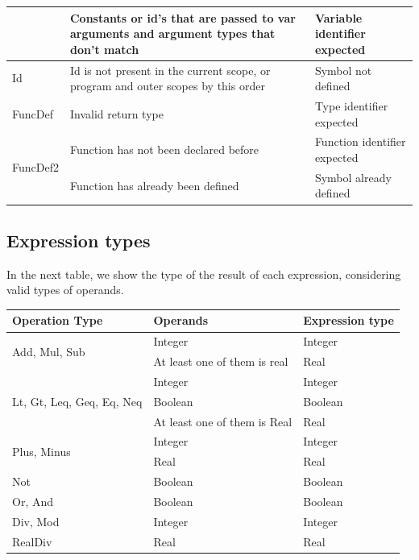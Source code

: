 \documentclass[12pt]{article}
\begin{document}
\begin{longtable} {|p{3.0cm} | p{8cm} | p{4.0cm}|}
						& Constants or id's that are passed to var arguments and argument types that don't match & Variable identifier expected  \\ \hline
	Id 					& Id is not present in the current scope, or program and outer scopes by this order & Symbol not defined  \\ \hline
	FuncDef			& Invalid return type & Type identifier expected \\ \hline
	\multirow{2}{*}{FuncDef2} & Function has not been declared before & Function identifier expected \\ \cline{2-3}
					& Function has already been defined & Symbol already defined \\ \hline

\end{longtable}

\newpage

\subsection{Expression types}

In the next table, we show the type of the result of each expression, considering valid types of operands. \\

\begin{tabularx} {\textwidth} {|X|X|X|} 
\hline 
 \textbf{Operation Type} 	& \textbf{Operands} & \textbf{Expression type} \\ \hline
	\multirow{2}{*}{Add, Mul, Sub} 	& Integer & Integer \\ \cline{2-3}
									& At least one of them is real & Real \\ \hline
	\multirow{3}{*}{Lt, Gt, Leq, Geq, Eq, Neq} 	& Integer & Integer \\ \cline{2-3}
												& Boolean & Boolean \\ \cline{2-3}
												& At least one of them is Real & Real \\ \hline
	\multirow{2}{*}{Plus, Minus} 				& Integer & Integer \\ \cline{2-3}
												& Real & Real \\ \hline
	Not & Boolean & Boolean \\ \hline
	Or, And & Boolean & Boolean \\ \hline
	Div, Mod & Integer & Integer \\ \hline
	RealDiv & Real & Real \\ \hline
	

\end{tabularx}
\end{document}

